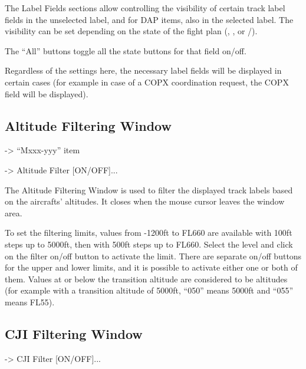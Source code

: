 \documentclass[a4paper,oneside,11pt]{memoir}
\begin{document}
\bigskip

The Label Fields sections allow controlling the visibility of certain track label fields in the unselected label, and for DAP items, also in the selected label. The visibility can be set depending on the state of the fight plan (, ,  or /).

\bigskip

The “All” buttons toggle all the state buttons for that field on/off.

\bigskip

Regardless of the settings here, the necessary label fields will be displayed in certain cases (for example in case of a COPX coordination request, the COPX field will be displayed).


\subsection{Altitude Filtering Window}
\label{win:afw}

 -> “Mxxx-yyy” item 

 -> Altitude Filter [ON/OFF]...

\bigskip

The Altitude Filtering Window is used to filter the displayed track labels based on the aircrafts’ altitudes. It closes when the mouse cursor leaves the window area.


To set the filtering limits, values from -1200ft to FL660 are available with 100ft steps up to 5000ft, then with 500ft steps up to FL660. Select the level and click on the filter on/off button to activate the limit. There are separate on/off buttons for the upper and lower limits, and it is possible to activate either one or both of them. Values at or below the transition altitude are considered to be altitudes (for example with a transition altitude of 5000ft, “050” means 5000ft and “055” means FL55).

\subsection{CJI Filtering Window}
\label{win:cji}

 -> CJI Filter [ON/OFF]...

\bigskip

\end{document}
